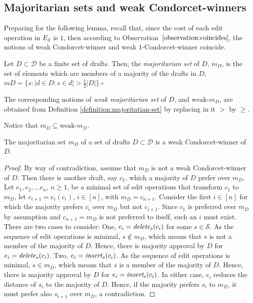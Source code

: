 \documentclass{llncs}
\newcommand{\qqed}{\hfill$\square$}
\newcommand{\calD}{\mathcal{D}}
\newcommand{\calS}{\mathcal{S}}
\newcommand{\iinsert}[1]{\emph{insert}_{#1}}
\newcommand{\ddelete}[1]{\emph{delete}_{#1}}
\begin{document}
\subsection{Majoritarian sets and weak Condorcet-winners}

Preparing for the following lemma, recall that, since the cost of each edit operation in $E_\calS$ is $1$, then according to Observation~$\ref{observation:coincides}$, the notions of weak Condorcet-winner and weak $1$-Condorcet-winner coincide.

\begin{definition}\label{definition:majoritatian-set}
%
Let $D \subset \calD$ be a finite set of drafts. Then, the \emph{majoritarian set} of $D$, $m_D$, is the set of elements which are members of a majority of the drafts in $D$, $mD = \{s: |d \in D : s \in d| > \frac{1}{2}{|D|}\}$.\qqed
%
\end{definition}

The corresponding notions of \emph{weak majoritarian set} of $D$, and $\textrm{weak-}m_D$, are obtained from Definition \ref{definition:majoritatian-set} by replacing in it $>$ by $\ge$.

Notice that $m_D \subseteq \textrm{weak-}m_D$.

\begin{lemma}
\label{lemma:condorcet-majoritarian}
The majoritarian set $m_D$ of a set of drafts $D \subset \calD$ is a weak Condorcet-winner of $D$.
\end{lemma}

\begin{proof}
%
By way of contradiction, assume that $m_D$ is not a weak Condorcet-winner of $D$.  Then there is another draft, say $c_1$, which a majority of $D$ prefer over $m_D$.  
Let $e_1, e_2, \ldots e_n$, $n \ge 1$, be a minimal set of edit operations that transform $c_1$ to $m_D$,  let $c_{i+1} = e_i(c_i)$, $ i \in [n]$, with $m_D = c_{n+1}$. Consider the first $i \in [n]$ for which the majority prefers $c_i$ over $m_D$ but not $c_{i+1}$.  Since $c_1$ is preferred over $m_D$ by assumption and $c_{n+1} = m_D$ is not preferred to itself, such an $i$ must exist.   
There are two cases to consider: One, $e_i = \ddelete{s}(c_i)$ for some $s \in \calS$.  As the sequence of edit operations is minimal,  $s \notin m_D$, which means that $s$ is not a member of the majority of $D$.  Hence, there is majority approval by $D$ for $e_i = \ddelete{s}(c_i)$.
Two, $e_i = \iinsert{s}(c_i)$.  As the sequence of edit operations is minimal,  $s \in m_D$, which means that $s$ is a member of the majority of $D$.  Hence, there is majority approval by $D$ for $e_i = \iinsert{s}(c_i)$.  In either case, $e_i$ reduces the distance of $s_i$ to the majority of $D$. Hence, if the majority prefers $s_i$ to $m_D$, it must prefer also $s_{i+1}$ over $m_D$, a contradiction.
%
\end{proof}
\end{document}
